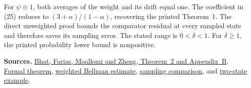 \documentclass[12pt,a4paper]{article}
\begin{document}
For \(\psi\equiv1\), both averages of the weight and its drift equal one.
The coefficient in (25) reduces to \((3+\alpha)/(1-\alpha)\), recovering
the printed Theorem~1. The direct unweighted proof bounds the comparator
residual at every sampled state and therefore saves its sampling error.
The stated range is \(0<\delta<1\). For \(\delta\ge1\),
the printed probability lower bound is nonpositive.

{\small\textbf{Sources.}
\href{https://moallemi.com/ciamac/papers/kernel-adp-2012.pdf\#page=28}{Bhat, Farias, Moallemi and Zheng, Theorem~2 and Appendix~B}.
\href{https://github.com/nikhilpb/kadp/blob/main/Kadp/Theorem2.lean}{Formal theorem},
\href{https://github.com/nikhilpb/kadp/blob/main/Kadp/Weighted.lean}{weighted Bellman estimate},
\href{https://github.com/nikhilpb/kadp/blob/main/Kadp/PopulationComparison.lean}{sampling comparison},
and \href{https://github.com/nikhilpb/kadp/blob/main/Kadp/Examples/Theorem2.lean}{two-state example}.}
\end{document}
